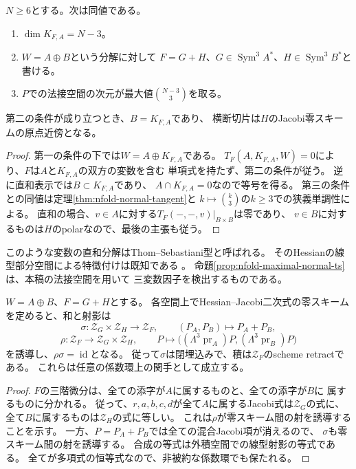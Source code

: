 \begin{proposition}[最大の法接空間と三変数の直和因子]
\label{prop:nfold-maximal-normal-ts}
$N\ge6$とする。次は同値である。
\begin{enumerate}
\item $\dim K_{F,A}=N-3$。
\item $W=A\oplus B$という分解に対して
$F=G+H$、$G\in\operatorname{Sym}^3A^*$、$H\in\operatorname{Sym}^3B^*$と書ける。
\item $P$での法接空間の次元が最大値$\binom{N-3}{3}$を取る。
\end{enumerate}
第二の条件が成り立つとき、$B=K_{F,A}$であり、
横断切片は$H$のJacobi零スキームの原点近傍となる。
\end{proposition}
\begin{proof}
第一の条件の下では$W=A\oplus K_{F,A}$である。
$T_F(A,K_{F,A},W)=0$により、$F$は$A$と$K_{F,A}$の双方の変数を含む
単項式を持たず、第二の条件が従う。
逆に直和表示では$B\subset K_{F,A}$であり、
$A\cap K_{F,A}=0$なので等号を得る。
第三の条件との同値は定理\ref{thm:nfold-normal-tangent}と
$k\mapsto\binom k3$の$k\ge3$での狭義単調性による。
直和の場合、$v\in A$に対する$T_F(-,-,v)|_{B\times B}$は零であり、
$v\in B$に対するものは$H$のpolarなので、最後の主張も従う。
\end{proof}

このような変数の直和分解はThom--Sebastiani型と呼ばれる。
そのHessianの線型部分空間による特徴付けは既知である
\cite[Theorem~3.4]{NFMBFFHessian}。
命題\ref{prop:nfold-maximal-normal-ts}は、本稿の法接空間を用いて
三変数因子を検出するものである。

\begin{proposition}[直和三次のJacobiスキームのretract]
\label{prop:nfold-ts-retract}
$W=A\oplus B$、$F=G+H$とする。
各空間上でHessian--Jacobi二次式の零スキームを定めると、和と射影は
\[
 \sigma:\mathcal Z_G\times\mathcal Z_H\longrightarrow\mathcal Z_F,
 \qquad (P_A,P_B)\longmapsto P_A+P_B,
\]
\[
 \rho:\mathcal Z_F\longrightarrow\mathcal Z_G\times\mathcal Z_H,
 \qquad P\longmapsto
  \bigl((\Lambda^3\operatorname{pr}_A)P,(\Lambda^3\operatorname{pr}_B)P\bigr)
\]
を誘導し、$\rho\sigma=\operatorname{id}$となる。
従って$\sigma$は閉埋込みで、積は$\mathcal Z_F$のscheme retractである。
これらは任意の係数環上の関手として成立する。
\end{proposition}
\begin{proof}
$F$の三階微分は、全ての添字が$A$に属するものと、全ての添字が$B$に
属するものに分かれる。
従って、$r,a,b,c,d$が全て$A$に属するJacobi式は$\mathcal Z_G$の式に、
全て$B$に属するものは$\mathcal Z_H$の式に等しい。
これは$\rho$が零スキーム間の射を誘導することを示す。
一方、$P=P_A+P_B$では全ての混合Jacobi項が消えるので、
$\sigma$も零スキーム間の射を誘導する。
合成の等式は外積空間での線型射影の等式である。
全てが多項式の恒等式なので、非被約な係数環でも保たれる。
\end{proof}

